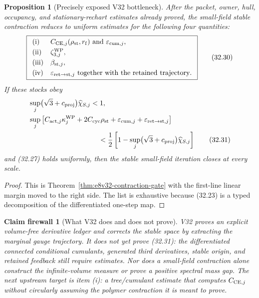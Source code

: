 \documentclass[11pt,oneside]{book}
\newtheorem{proposition}[theorem]{Proposition}
\newtheorem{firewall}[theorem]{Claim firewall}
\theoremstyle{definition}
\theoremstyle{remark}
\begin{document}
\begin{proposition}[Precisely exposed V32 bottleneck]
\label{prop:e8v32-bottleneck}
After the packet, owner, hull, occupancy, and stationary-rechart
estimates already proved, the small-field stable contraction reduces
to uniform estimates for the following four quantities:
\[
\boxed{
\begin{array}{ll}
\text{\rm (i)}&
C_{{\rm CE},j}(\rho_{\rm st},r_{\rm f})
\ \text{and }\varepsilon_{{\rm cum},j},\\[1mm]
\text{\rm (ii)}&
\zeta^{\rm WP}_{3,j},\\[1mm]
\text{\rm (iii)}&
\beta_{{\rm st},j},\\[1mm]
\text{\rm (iv)}&
\varepsilon_{{\rm ret}\to{\rm st},j}
\ \text{together with the retained trajectory}.
\end{array}}                                                     \tag{32.30}
\]
If these stocks obey
\[
\begin{split}
 &\sup_j\bigl(\sqrt3+c_{\rm proj}\bigr)\widehat\chi_{S,j}<1,\\
 &\sup_j\left[
 C_{{\rm act},j}\kappa_j^{\rm WP}
 +2C_{\rm cyc}\rho_{\rm st}
 +\varepsilon_{{\rm cum},j}
 +\varepsilon_{{\rm ret}\to{\rm st},j}
 \right]\\
 &\hspace{35mm}<
 \frac12\left[
 1-\sup_j\bigl(\sqrt3+c_{\rm proj}\bigr)
 \widehat\chi_{S,j}
 \right]                                                        \tag{32.31}
\end{split}
\]
and (32.27) holds uniformly, then the stable small-field iteration
closes at every scale.
\end{proposition}

\begin{proof}
This is Theorem~\ref{thm:e8v32-contraction-gate} with the first-line
linear margin moved to the right side.  The list is exhaustive
because (32.23) is a typed decomposition of the differentiated
one-step map.
\end{proof}

\begin{firewall}[What V32 does and does not prove]
\label{fire:e8v32-status}
V32 proves an explicit volume-free derivative ledger and corrects
the stable space by extracting the marginal gauge trajectory.  It
does not yet prove (32.31): the differentiated connected conditional
cumulants, generated third derivatives, stable origin, and retained
feedback still require estimates.  Nor does a small-field
contraction alone construct the infinite-volume measure or prove a
positive spectral mass gap.  The next upstream target is item (i):
a tree/cumulant estimate that computes \(C_{{\rm CE},j}\) without
circularly assuming the polymer contraction it is meant to prove.
\end{firewall}
\end{document}
